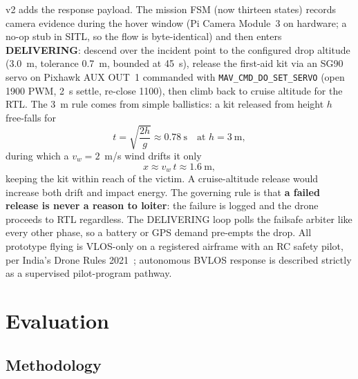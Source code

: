 \documentclass[conference]{IEEEtran}
\begin{document}
v2 adds the response payload. The mission FSM (now thirteen states)
records camera evidence during the hover window (Pi Camera Module~3 on
hardware; a no-op stub in SITL, so the flow is byte-identical) and
then enters \textbf{DELIVERING}: descend over the incident point to
the configured drop altitude (3.0~m, tolerance 0.7~m, bounded at
45~s), release the first-aid kit via an SG90 servo on Pixhawk AUX
OUT~1 commanded with \texttt{MAV\_CMD\_DO\_SET\_SERVO} (open 1900 PWM,
2~s settle, re-close 1100), then climb back to cruise altitude for the
RTL. The 3~m rule comes from simple ballistics: a kit released from
height $h$ free-falls for
\begin{equation}
\label{eq:fall}
t = \sqrt{\frac{2h}{g}} \approx 0.78~\mathrm{s}
\quad \text{at } h = 3~\mathrm{m},
\end{equation}
during which a $v_w = 2$~m/s wind drifts it only
\begin{equation}
\label{eq:drift}
x \approx v_w\,t \approx 1.6~\mathrm{m},
\end{equation}
keeping the kit within reach of the victim. A cruise-altitude release
would increase both drift and impact energy. The governing rule is
that \textbf{a failed release is never a reason to loiter}: the
failure is logged and the drone proceeds to RTL regardless. The
DELIVERING loop polls the failsafe arbiter like every other phase, so
a battery or GPS demand pre-empts the drop. All prototype flying is
VLOS-only on a registered airframe with an RC safety pilot, per
India's Drone Rules 2021~\cite{dronerules}; autonomous BVLOS response
is described strictly as a supervised pilot-program pathway.

\section{Evaluation}
\label{sec:eval}

\subsection{Methodology}
\end{document}
